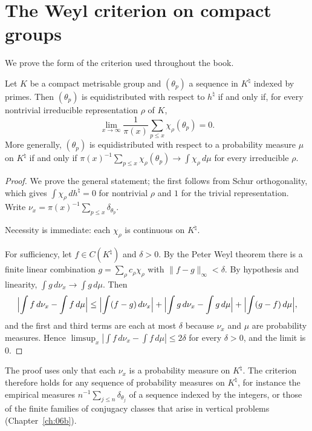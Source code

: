 \section{The Weyl criterion on compact groups}

We prove the form of the criterion used throughout the book.

\begin{theorem}\label{thm:04weyl}
Let $K$ be a compact metrisable group and $(\theta_p)$ a sequence in $K^\natural$ indexed by primes. Then $(\theta_p)$ is equidistributed with respect to $h^\natural$ if and only if, for every nontrivial irreducible representation $\rho$ of $K$,
\[
\lim_{x\to\infty}\frac{1}{\pi(x)}\sum_{p\le x}\chi_\rho(\theta_p) = 0 .
\]
More generally, $(\theta_p)$ is equidistributed with respect to a probability measure $\mu$ on $K^\natural$ if and only if $\pi(x)^{-1}\sum_{p\le x}\chi_\rho(\theta_p) \to \int \chi_\rho\,d\mu$ for every irreducible $\rho$.
\end{theorem}

\begin{proof}
We prove the general statement; the first follows from Schur orthogonality, which gives $\int \chi_\rho\,dh^\natural = 0$ for nontrivial $\rho$ and $1$ for the trivial representation. Write $\nu_x = \pi(x)^{-1}\sum_{p\le x}\delta_{\theta_p}$.

Necessity is immediate: each $\chi_\rho$ is continuous on $K^\natural$.

For sufficiency, let $f \in C(K^\natural)$ and $\delta > 0$. By the Peter Weyl theorem there is a finite linear combination $g = \sum_\rho c_\rho\chi_\rho$ with $\|f - g\|_\infty < \delta$. By hypothesis and linearity, $\int g\,d\nu_x \to \int g\,d\mu$. Then
\[
\Bigl|\int f\,d\nu_x - \int f\,d\mu\Bigr|
\le \Bigl|\int (f-g)\,d\nu_x\Bigr| + \Bigl|\int g\,d\nu_x - \int g\,d\mu\Bigr| + \Bigl|\int (g-f)\,d\mu\Bigr| ,
\]
and the first and third terms are each at most $\delta$ because $\nu_x$ and $\mu$ are probability measures. Hence $\limsup_x |\int f\,d\nu_x - \int f\,d\mu| \le 2\delta$ for every $\delta > 0$, and the limit is $0$.
\end{proof}

The proof uses only that each $\nu_x$ is a probability measure on $K^\natural$. The criterion therefore holds for any sequence of probability measures on $K^\natural$, for instance the empirical measures $n^{-1}\sum_{j\le n}\delta_{\theta_j}$ of a sequence indexed by the integers, or those of the finite families of conjugacy classes that arise in vertical problems (Chapter~\ref{ch:06b}).

